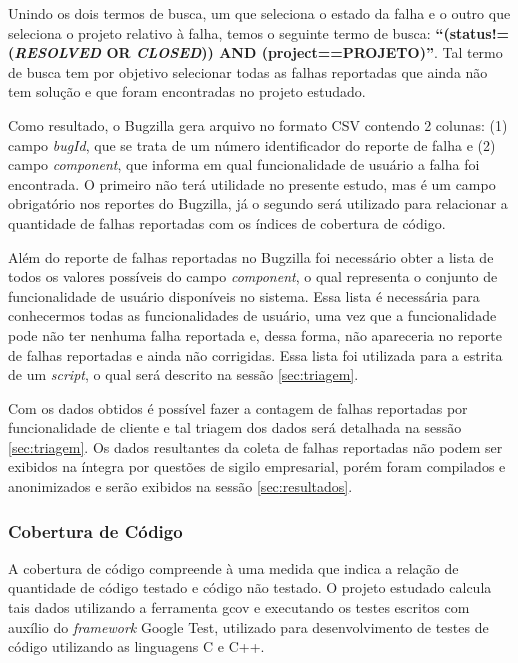 \documentclass[11.5pt]{article}
\begin{document}
Unindo os dois termos de busca, um que seleciona o estado da falha e o outro que seleciona o projeto
relativo à falha, temos o seguinte termo de busca:
\textbf{``(status!=(\textit{RESOLVED} OR \textit{CLOSED})) AND (project==PROJETO)''}.
Tal termo de busca tem por objetivo selecionar todas as falhas reportadas que ainda não tem solução
e que foram encontradas no projeto estudado.

Como resultado, o Bugzilla gera arquivo no formato CSV contendo 2 colunas:
(1) campo \textit{bugId}, que se trata de um número identificador do reporte de falha e
(2) campo \textit{component}, que informa em qual funcionalidade de usuário a falha foi encontrada.
O primeiro não terá utilidade no presente estudo, mas é um campo obrigatório nos reportes do
Bugzilla, já o segundo será utilizado para relacionar a quantidade de falhas reportadas com os
índices de cobertura de código.

Além do reporte de falhas reportadas no Bugzilla foi necessário obter a lista de todos os valores
possíveis do campo \textit{component}, o qual representa o conjunto de funcionalidade de usuário
disponíveis no sistema.
Essa lista é necessária para conhecermos todas as funcionalidades de usuário, uma vez que a
funcionalidade pode não ter nenhuma falha reportada e, dessa forma, não apareceria no reporte de
falhas reportadas e ainda não corrigidas.
Essa lista foi utilizada para a estrita de um \textit{script}, o qual será descrito na sessão
\ref{sec:triagem}.

Com os dados obtidos é possível fazer a contagem de falhas reportadas por funcionalidade de cliente
e tal triagem dos dados será detalhada na sessão \ref{sec:triagem}.
Os dados resultantes da coleta de falhas reportadas não podem ser exibidos na íntegra por questões
de sigilo empresarial, porém foram compilados e anonimizados e serão exibidos na sessão
\ref{sec:resultados}.

\subsubsection{Cobertura de Código} \label{sec:cobertura}

A cobertura de código compreende à uma medida que indica a relação de quantidade de código testado
e código não testado.
O projeto estudado calcula tais dados utilizando a ferramenta gcov e executando os testes escritos
com auxílio do \textit{framework} Google Test, utilizado para desenvolvimento de testes de código
utilizando as linguagens C e C++.
\end{document}

